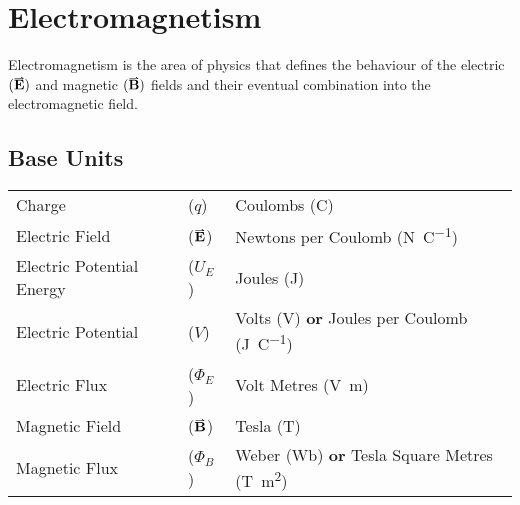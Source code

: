 \documentclass[main.tex]{subfiles}
\begin{document}
    \chapter{Electromagnetism}
        \label{ch: Electromagnetism}
        \thispagestyle{noheader}

        Electromagnetism is the area of physics that defines the behaviour of the electric $(\vect{E})$ and magnetic $(\vect{B})$ fields and their eventual combination into the electromagnetic field.

        \section{Base Units}
            \label{sec: Base Units - Electromagnetism}
            \begin{table}[!h]
                \noindent\begin{tabular}{@{} p{45mm} C{10mm} p{110mm}}
                    Charge &($q$) &Coulombs (\si{\coulomb})\\[\tablegap]
                    Electric Field &($\vect{E}$) &Newtons per Coulomb (\si{\newton\per\coulomb})\\[\tablegap]
                    Electric Potential Energy &($U_E$) &Joules (\si{\joule})\\[\tablegap]
                    Electric Potential &($V$) &Volts (\si{\volt}) \textbf{or} Joules per Coulomb (\si{\joule \per\coulomb})\\[\tablegap]
                    Electric Flux &($\Phi_E$) &Volt Metres (\si{\volt \metre})\\[\tablegap]
                    Magnetic Field &($\vect{B}$) &Tesla (\si{\tesla})\\[\tablegap]
                    Magnetic Flux &($\Phi_B$) &Weber (\si{\weber}) \textbf{or} Tesla Square Metres (\si{\tesla \metre\squared})
                \end{tabular}
            \end{table}
            
\end{document}
